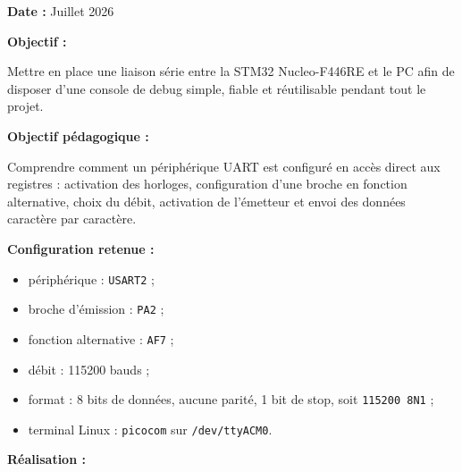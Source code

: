 \documentclass[11pt,a4paper]{article}
\begin{document}
	\begin{sessionbox}
		
		\textbf{Date :} Juillet 2026
		
		\vspace{0.3cm}
		
		\textbf{Objectif :}
		
		Mettre en place une liaison série entre la STM32 Nucleo-F446RE et le PC afin de disposer d'une console de debug simple, fiable et réutilisable pendant tout le projet.
		
		\vspace{0.3cm}
		
		\textbf{Objectif pédagogique :}
		
		Comprendre comment un périphérique UART est configuré en accès direct aux registres : activation des horloges, configuration d'une broche en fonction alternative, choix du débit, activation de l'émetteur et envoi des données caractère par caractère.
		
		\vspace{0.3cm}
		
		\textbf{Configuration retenue :}
		
		\begin{itemize}
			\item périphérique : \texttt{USART2} ;
			\item broche d'émission : \texttt{PA2} ;
			\item fonction alternative : \texttt{AF7} ;
			\item débit : 115200 bauds ;
			\item format : 8 bits de données, aucune parité, 1 bit de stop, soit \texttt{115200 8N1} ;
			\item terminal Linux : \texttt{picocom} sur \texttt{/dev/ttyACM0}.
		\end{itemize}
		
		\vspace{0.3cm}
		
		\textbf{Réalisation :}
		

\end{sessionbox}
\end{document}
